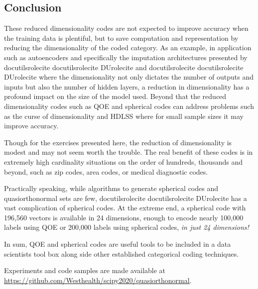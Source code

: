 \documentclass[]{article}
\providecommand*{\DUrole}[2]{%
  \ifcsname docutilsrole#1\endcsname%
    \csname docutilsrole#1\endcsname{#2}%
  \else
    \csname DUrole#1\endcsname{#2}%
  \fi%
}
\begin{document}
\subsection{Conclusion%
  \label{conclusion}%
}


These reduced dimensionality codes are not expected to improve accuracy when the training data is plentiful, but to save computation and representation by reducing the dimensionality of the coded category. As an example, in application such as autoencoders and specifically the imputation architectures presented by \DUrole{cite}{gondara} and \DUrole{cite}{lu} where the dimensionality not only dictates the number of outputs and inputs but also the number of hidden layers, a reduction in dimensionality has a profound impact on the size of the model used. Beyond that the reduced dimensionality codes such as QOE and spherical codes can address problems such as the curse of dimensionality and HDLSS where for small sample sizes it may improve accuracy.

Though for the exercises presented here, the reduction of dimensionality is modest and may not seem worth the trouble. The real benefit of these codes is in extremely high cardinality situations on the order of hundreds, thousands and beyond, such as zip codes, area codes, or medical diagnostic codes.

Practically speaking, while algorithms to generate spherical codes and quasiorthonormal sets are few, \DUrole{cite}{sphere} has a vast complication of spherical codes. At the extreme end, a spherical code with 196,560 vectors is available in 24 dimensions, enough to encode nearly 100,000 labels using QOE or 200,000 labels using spherical codes, \emph{in just 24 dimensions!}

In sum, QOE and spherical codes are useful tools to be included in a data scientists tool box along side other established categorical coding techniques.

Experiments and code samples are made available at \href{https://github.com/Westhealth/scipy2020/quasiorthonormal/}{https://github.com/Westhealth/scipy2020/quasiorthonormal}.


\end{document}
